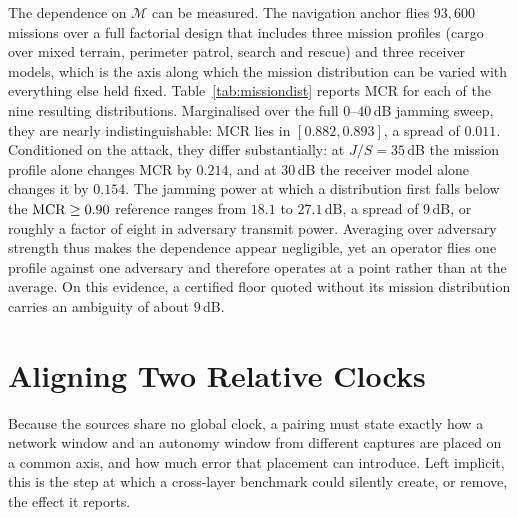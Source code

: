 The dependence on $\mathcal{M}$ can be measured. The navigation anchor flies
$93{,}600$ missions over a full factorial design that includes three mission
profiles (cargo over mixed terrain, perimeter patrol, search and rescue) and
three receiver models, which is the axis along which the mission distribution
can be varied with everything else held fixed. Table~\ref{tab:missiondist}
reports MCR for each of the nine resulting distributions. Marginalised over the
full $0$--$40$\,dB jamming sweep, they are nearly indistinguishable: MCR lies in
$[0.882,0.893]$, a spread of $0.011$. Conditioned on the attack, they differ
substantially: at $J/S=35$\,dB the mission profile alone changes MCR by
$0.214$, and at $30$\,dB the receiver model alone changes it by $0.154$. The
jamming power at which a distribution first falls below the $\mathrm{MCR}\ge0.90$
reference ranges from $18.1$ to $27.1$\,dB, a spread of $9$\,dB, or roughly a
factor of eight in adversary transmit power. Averaging over adversary strength
thus makes the dependence appear negligible, yet an operator flies one profile
against one adversary and therefore operates at a point rather than at the
average. On this evidence, a certified floor quoted without its mission
distribution carries an ambiguity of about $9$\,dB.

\begin{table}[t]
\centering
\caption{MCR under the composed defence for each of nine mission distributions,
marginalised over the $0$--$40$\,dB jamming sweep, with Wilson $95\%$ intervals.
The marginal spread is small; the spread conditional on attack strength
reaches $0.214$, and the $J/S$ at which MCR crosses $0.90$ spans $9$\,dB.
Provenance: simulation (physics-informed). Generated by
.}
\label{tab:missiondist}
\scriptsize
\renewcommand{\arraystretch}{1.02}

\end{table}

\section{Aligning Two Relative Clocks}
\label{app:alignment}
Because the sources share no global clock, a  pairing
must state exactly how a network window and an autonomy window from different
captures are placed on a common axis, and how much error that placement can
introduce. Left implicit, this is the step at which a cross-layer benchmark
could silently create, or remove, the effect it reports.

